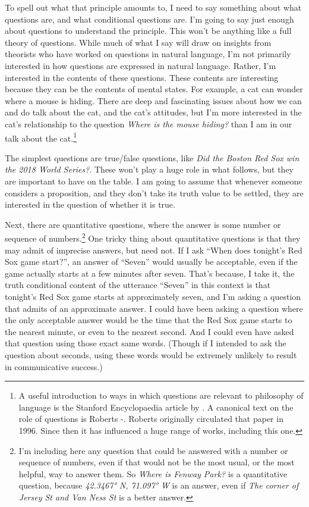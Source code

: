 \documentclass[
  11pt,
]{book}
\begin{document}
To spell out what that principle amounts to, I need to say something about what questions are, and what conditional questions are. I'm going to say just enough about questions to understand the principle. This won't be anything like a full theory of questions. While much of what I say will draw on insights from theorists who have worked on questions in natural language, I'm not primarily interested in how questions are expressed in natural language. Rather, I'm interested in the contents of these questions. These contents are interesting because they can be the contents of mental states. For example, a cat can wonder where a mouse is hiding. There are deep and fascinating issues about how we can and do talk about the cat, and the cat's attitudes, but I'm more interested in the cat's relationship to the question \emph{Where is the mouse hiding?} than I am in our talk about the cat.\footnote{A useful introduction to ways in which questions are relevant to philosophy of language is the Stanford Encyclopaedia article by \citet{sep-questions}. A canonical text on the role of questions is Roberts -\citet{Roberts2012}. Roberts originally circulated that paper in 1996. Since then it has influenced a huge range of works, including this one.}

The simplest questions are true/false questions, like \emph{Did the Boston Red Sox win the 2018 World Series?}. These won't play a huge role in what follows, but they are important to have on the table. I am going to assume that whenever someone considers a proposition, and they don't take its truth value to be settled, they are interested in the question of whether it is true.

Next, there are quantitative questions, where the answer is some number or sequence of numbers.\footnote{I'm including here any question that could be answered with a number or sequence of numbers, even if that would not be the most usual, or the most helpful, way to answer them. So \emph{Where is Fenway Park?} is a quantitative question, because \emph{42.3467° N, 71.097° W} is an answer, even if \emph{The corner of Jersey St and Van Ness St} is a better answer.} One tricky thing about quantitative questions is that they may admit of imprecise answers, but need not. If I ask ``When does tonight's Red Sox game start?'', an answer of ``Seven'' would usually be acceptable, even if the game actually starts at a few minutes after seven. That's because, I take it, the truth conditional content of the utterance ``Seven'' in this context is that tonight's Red Sox game starts at approximately seven, and I'm asking a question that admits of an approximate answer. I could have been asking a question where the only acceptable answer would be the time that the Red Sox game starts to the nearest minute, or even to the nearest second. And I could even have asked that question using those exact same words. (Though if I intended to ask the question about seconds, using these words would be extremely unlikely to result in communicative success.)
\end{document}
